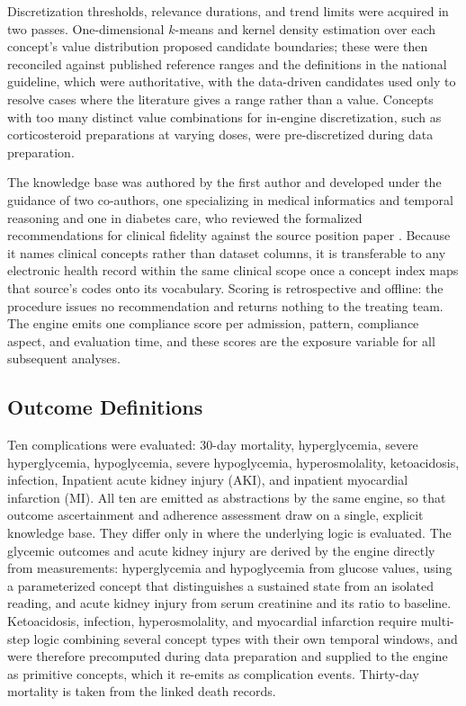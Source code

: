 Discretization thresholds, relevance durations, and trend limits were
acquired in two passes. One-dimensional $k$-means and kernel density
estimation over each concept's value distribution proposed candidate
boundaries; these were then reconciled against published reference ranges
and the definitions in the national guideline, which were authoritative,
with the data-driven candidates used only to resolve cases where the
literature gives a range rather than a value. Concepts with too many
distinct value combinations for in-engine discretization, such as
corticosteroid preparations at varying doses, were pre-discretized during
data preparation.

The knowledge base was authored by the first author and developed under the
guidance of two co-authors, one specializing in medical informatics and
temporal reasoning and one in diabetes care, who reviewed the formalized
recommendations for clinical fidelity against the source position paper
\citep{hochberg2023inpatient}. Because it names clinical concepts
rather than dataset columns, it is transferable to any electronic health
record within the same clinical scope once a concept index maps that
source's codes onto its vocabulary. Scoring is retrospective and offline:
the procedure issues no recommendation and returns nothing to the treating
team. The engine emits one compliance score per admission, pattern,
compliance aspect, and evaluation time, and these scores are the exposure
variable for all subsequent analyses.

\subsection{Outcome Definitions}

Ten complications were evaluated: 30-day mortality, hyperglycemia, severe
hyperglycemia, hypoglycemia, severe hypoglycemia, hyperosmolality,
ketoacidosis, infection, Inpatient acute kidney injury (AKI), and inpatient myocardial infarction (MI).
All ten are emitted as abstractions by the same engine, so that outcome
ascertainment and adherence assessment draw on a single, explicit knowledge
base. They differ only in where the underlying logic is evaluated. The
glycemic outcomes and acute kidney injury are derived by the engine directly
from measurements: hyperglycemia and hypoglycemia from glucose values, using
a parameterized concept that distinguishes a sustained state from an
isolated reading, and acute kidney injury from serum creatinine and its
ratio to baseline. Ketoacidosis, infection, hyperosmolality, and myocardial
infarction require multi-step logic combining several concept types with
their own temporal windows, and were therefore precomputed during data
preparation and supplied to the engine as primitive concepts, which it
re-emits as complication events. Thirty-day mortality is taken from the
linked death records.

